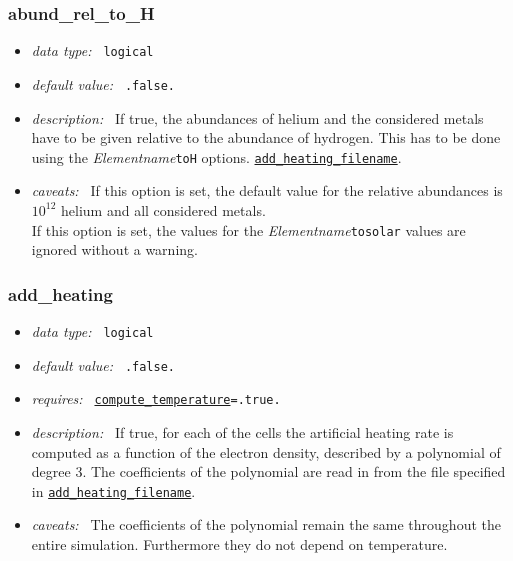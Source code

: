 \documentclass[a4paper,10pt]{article}
\begin{document}
\subsubsection{abund\_rel\_to\_H}
\label{opt:abundreltoh}
\begin{itemize}
 \item \textit{data type:~} \texttt{logical}
 \item \textit{default value:~} \texttt{.false.}
 \item \textit{description:~} If true, the abundances of helium and the 
  considered metals have to be given relative to the abundance of hydrogen.
  This has to be done using the \textit{Elementname}\texttt{toH} options.
  \texttt{\hyperref[opt:addheatingfilename]{add\_heating\_filename}}.
 \item \textit{caveats:~} If this option is set, the default value for the relative
  abundances is $10^{12}$ helium and all considered metals.\\
  If this option is set, the values for the \textit{Elementname}\texttt{tosolar}
  values are ignored without a warning.
\end{itemize}


\subsubsection{add\_heating}
\label{opt:addheating}
\begin{itemize}
 \item \textit{data type:~} \texttt{logical}
 \item \textit{default value:~} \texttt{.false.}
 \item \textit{requires:~} 
  \texttt{\hyperref[opt:computetemperature]{compute\_temperature}=.true.}
 \item \textit{description:~} If true, for each of the cells the artificial
  heating rate is computed as a function of the electron density, described by 
  a polynomial of degree 3. The coefficients of the polynomial are 
  read in from the file specified in 
  \texttt{\hyperref[opt:addheatingfilename]{add\_heating\_filename}}.
 \item \textit{caveats:~} The coefficients of the polynomial remain the same
  throughout the entire simulation. Furthermore they do not depend on 
  temperature.
\end{itemize}
\end{document}
